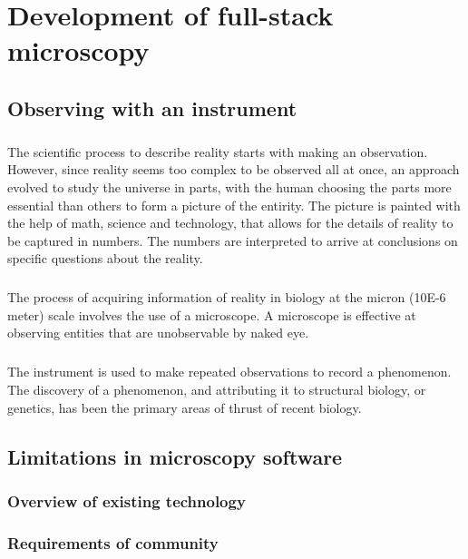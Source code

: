 \chapter{Development of full-stack microscopy}
\section{Observing with an instrument}
\paragraph*{} The scientific process to describe reality starts with making an observation. However, since reality seems too complex to be observed all at once, an approach evolved to study the universe in parts, with the human choosing the parts more essential than others to form a picture of the entirity. The picture is painted with the help of math, science and technology, that allows for the details of reality to be captured in numbers. The numbers are interpreted to arrive at conclusions on specific questions about the reality.

\paragraph*{} The process of acquiring information of reality in biology at the micron (10E-6 meter) scale involves the use of a microscope. A microscope is effective at observing entities that are unobservable by naked eye. 

\paragraph*{}The instrument is used to make repeated observations to record a phenomenon. The discovery of a phenomenon, and attributing it to structural biology, or genetics, has been the primary areas of thrust of recent biology.




\section{Limitations in microscopy software}
\subsection{Overview of existing technology}
\subsection{Requirements of community}
